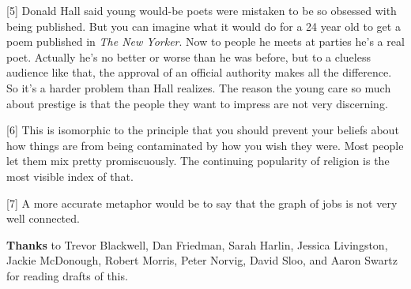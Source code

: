 {[}5{]} Donald Hall said young would-be poets were mistaken to be so
obsessed with being published. But you can imagine what it would do for
a 24 year old to get a poem published in \emph{The New Yorker}. Now to
people he meets at parties he's a real poet. Actually he's no better or
worse than he was before, but to a clueless audience like that, the
approval of an official authority makes all the difference. So it's a
harder problem than Hall realizes. The reason the young care so much
about prestige is that the people they want to impress are not very
discerning.

{[}6{]} This is isomorphic to the principle that you should prevent your
beliefs about how things are from being contaminated by how you wish
they were. Most people let them mix pretty promiscuously. The continuing
popularity of religion is the most visible index of that.

{[}7{]} A more accurate metaphor would be to say that the graph of jobs
is not very well connected.

\textbf{Thanks} to Trevor Blackwell, Dan Friedman, Sarah Harlin, Jessica
Livingston, Jackie McDonough, Robert Morris, Peter Norvig, David Sloo,
and Aaron Swartz for reading drafts of this.
